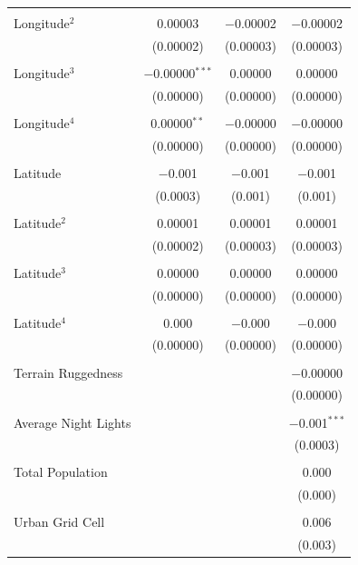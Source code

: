 \documentclass[11pt, oneside]{article}   	%
\begin{document}
\begin{spacing}{1.3}
\begin{table}[h]
{\begin{tabular}{@{\extracolsep{0pt}}lccc}
        & & & \\[-1.8ex]
       Longitude$^{2}$ & 0.00003 & $-$0.00002 & $-$0.00002 \\
        & (0.00002) & (0.00003) & (0.00003) \\
        & & & \\[-1.8ex]
       Longitude$^{3}$ & $-$0.00000$^{***}$ & 0.00000 & 0.00000 \\
        & (0.00000) & (0.00000) & (0.00000) \\
        & & & \\[-1.8ex]
       Longitude$^{4}$ & 0.00000$^{**}$ & $-$0.00000 & $-$0.00000 \\
        & (0.00000) & (0.00000) & (0.00000) \\
        & & & \\[-1.8ex]
       Latitude & $-$0.001 & $-$0.001 & $-$0.001 \\
        & (0.0003) & (0.001) & (0.001) \\
        & & & \\[-1.8ex]
       Latitude$^{2}$ & 0.00001 & 0.00001 & 0.00001 \\
        & (0.00002) & (0.00003) & (0.00003) \\
        & & & \\[-1.8ex]
       Latitude$^{3}$ & 0.00000 & 0.00000 & 0.00000 \\
        & (0.00000) & (0.00000) & (0.00000) \\
        & & & \\[-1.8ex]
       Latitude$^{4}$ & 0.000 & $-$0.000 & $-$0.000 \\
        & (0.00000) & (0.00000) & (0.00000) \\
        & & & \\[-1.8ex]
       Terrain Ruggedness &  &  & $-$0.00000 \\
        &  &  & (0.00000) \\
        & & & \\[-1.8ex]
       Average Night Lights &  &  & $-$0.001$^{***}$ \\
        &  &  & (0.0003) \\
        & & & \\[-1.8ex]
       Total Population &  &  & 0.000 \\
        &  &  & (0.000) \\
        & & & \\[-1.8ex]
       Urban Grid Cell &  &  & 0.006 \\
        &  &  & (0.003) \\

\end{tabular}}
\end{table}
\end{spacing}
\end{document}
